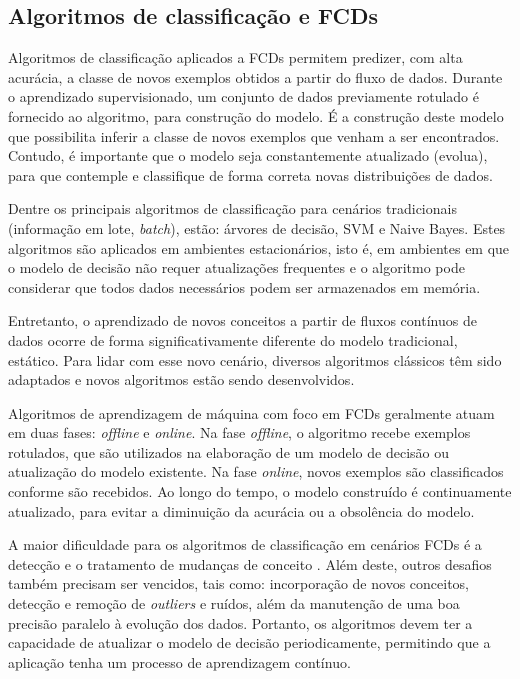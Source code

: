 \documentclass[qual, classic, a4paper]{ufbathesis}
\begin{document}
\subsection{Algoritmos de classificação e FCDs}

Algoritmos de classificação aplicados a FCDs permitem predizer, com alta acurácia, a classe de novos exemplos obtidos a partir do fluxo de dados. 
Durante o aprendizado supervisionado, um conjunto de dados previamente rotulado é fornecido ao algoritmo, para construção do modelo. É a construção deste modelo que possibilita inferir a classe de novos exemplos que venham a ser encontrados. Contudo, é importante que o modelo seja constantemente atualizado (evolua), para que contemple e classifique de forma correta novas distribuições de dados.

Dentre os principais algoritmos de classificação para cenários tradicionais (informação em lote, \textit{batch}), estão: árvores de decisão, SVM e Naive Bayes. Estes algoritmos são aplicados em ambientes estacionários, isto é, em ambientes em que o modelo de decisão não requer atualizações frequentes e o algoritmo pode considerar que todos dados necessários podem ser armazenados em memória.

Entretanto, o aprendizado de novos conceitos a partir de fluxos contínuos de dados ocorre de forma significativamente diferente do modelo tradicional, estático. Para lidar com esse novo cenário, diversos algoritmos clássicos têm sido adaptados e novos algoritmos estão sendo desenvolvidos.

Algoritmos de aprendizagem de máquina com foco em FCDs geralmente atuam em duas fases: \textit{offline} e \textit{online}. Na fase \textit{offline}, o algoritmo recebe exemplos rotulados, que são utilizados na elaboração de um modelo de decisão ou atualização do modelo existente. Na fase \textit{online}, novos exemplos são classificados conforme são recebidos. Ao longo do tempo, o modelo construído é continuamente atualizado, para evitar a diminuição da acurácia ou a obsolência do modelo.

A maior dificuldade para os algoritmos de classificação em cenários FCDs é a detecção e o tratamento de mudanças de conceito \cite{Aggarwal:2006:DSM:1196418}. 
Além deste, outros desafios também precisam ser vencidos, tais como: incorporação de novos conceitos, detecção e remoção de \textit{outliers} e ruídos, além da manutenção de uma boa precisão paralelo à evolução dos dados. Portanto, os algoritmos devem ter a capacidade de atualizar o modelo de decisão periodicamente, permitindo que a aplicação tenha um processo de aprendizagem contínuo.
\end{document}
